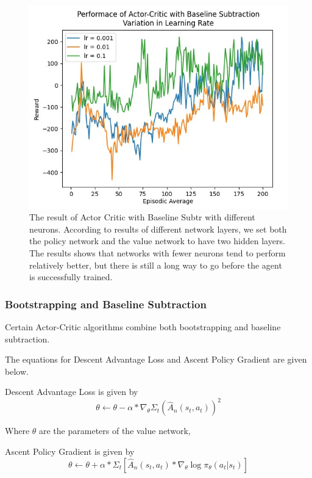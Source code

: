 \documentclass{article}
\begin{document}
\begin{figure}[h!]
\centering
\includegraphics[width=0.9\linewidth]{Report/images/09.Performance_of_Actor_Critc_BSub_LR.png}
\caption{\label{fig:ActorCritic with Baseline Subtraction - Variation in Learning Rate}The result of Actor Critic with Baseline Subtr with different neurons. According to results of different network layers, we set both the policy network and the value network to have two hidden layers. The results shows that networks with fewer neurons tend to perform relatively better, but there is still a long way to go before the agent is successfully trained.}
\end{figure}
\subsubsection{Bootstrapping and Baseline Subtraction}
Certain Actor-Critic algorithms combine both bootstrapping and baseline subtraction. 

The equations for Descent Advantage Loss and Ascent Policy Gradient are given below. 
\par Descent Advantage Loss is given by
\begin{equation*}
\theta \leftarrow \theta - \alpha * \nabla_\theta\Sigma_t(\hat{A}_n(s_t,a_t))^2
\end{equation*}

Where $\theta$ are the parameters of the value network, 

Ascent Policy Gradient is given by
\begin{equation*}
\theta \leftarrow \theta + \alpha * \Sigma_t[\hat{A}_n(s_t,a_t)*\nabla_\theta\log\pi_\theta(a_t|s_t)]
\end{equation*}
\end{document}
